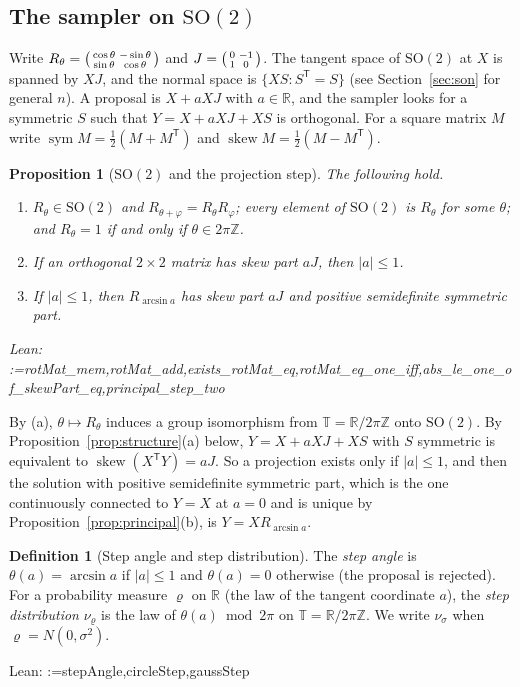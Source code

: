 \documentclass[11pt]{amsart}
\makeatletter
\newtheorem{proposition}[theorem]{Proposition}
\theoremstyle{definition}
\newtheorem{definition}[theorem]{Definition}
\theoremstyle{remark}
\newcommand{\@leanlist}[1]{\def\@leansep{}\@for\@leanname:=#1\do{\@leansep
  \texttt{\expandafter\detokenize\expandafter{\@leanname}}\def\@leansep{, }}}
\newcommand{\lean}[1]{\par\smallskip\noindent
  {\footnotesize\normalfont\raggedright\textsf{Lean:} \@leanlist{#1}\par}}
\newcommand{\R}{\mathbb{R}}
\newcommand{\Z}{\mathbb{Z}}
\newcommand{\T}{\mathbb{T}}
\newcommand{\SO}{\mathrm{SO}}
\newcommand{\sym}{\operatorname{sym}}
\newcommand{\skw}{\operatorname{skew}}
\newcommand{\transp}{^{\mathsf T}}
\makeatother
\begin{document}
\subsection{The sampler on \texorpdfstring{$\SO(2)$}{SO(2)}}
Write $R_\theta=\begin{psmallmatrix}\cos\theta&-\sin\theta\\\sin\theta&\cos\theta\end{psmallmatrix}$
and $J=\begin{psmallmatrix}0&-1\\1&0\end{psmallmatrix}$.  The tangent space of $\SO(2)$ at $X$
is spanned by $XJ$, and the normal space is $\{XS:S\transp=S\}$ (see Section~\ref{sec:son} for
general $n$).  A proposal is $X+aXJ$ with $a\in\R$, and the sampler looks for a symmetric $S$
such that $Y=X+aXJ+XS$ is orthogonal.  For a square matrix $M$ write
$\sym M=\tfrac12(M+M\transp)$ and $\skw M=\tfrac12(M-M\transp)$.

\begin{proposition}[$\SO(2)$ and the projection step]\label{prop:so2-model}
The following hold.
\begin{enumerate}
\item[(a)] $R_\theta\in\SO(2)$ and $R_{\theta+\varphi}=R_\theta R_\varphi$; every element of
$\SO(2)$ is $R_\theta$ for some $\theta$; and $R_\theta=1$ if and only if $\theta\in2\pi\Z$.
\item[(b)] If an orthogonal $2\times2$ matrix has skew part $aJ$, then $|a|\le1$.
\item[(c)] If $|a|\le1$, then $R_{\arcsin a}$ has skew part $aJ$ and positive semidefinite
symmetric part.
\end{enumerate}
\lean{rotMat_mem,rotMat_add,exists_rotMat_eq,rotMat_eq_one_iff,abs_le_one_of_skewPart_eq,principal_step_two}
\end{proposition}

By (a), $\theta\mapsto R_\theta$ induces a group isomorphism from $\T=\R/2\pi\Z$ onto $\SO(2)$.
By Proposition~\ref{prop:structure}(a) below, $Y=X+aXJ+XS$ with $S$ symmetric is equivalent to
$\skw(X\transp Y)=aJ$.  So a projection exists only if $|a|\le1$, and then the solution with
positive semidefinite symmetric part, which is the one continuously connected to $Y=X$ at $a=0$
and is unique by Proposition~\ref{prop:principal}(b), is $Y=XR_{\arcsin a}$.

\begin{definition}[Step angle and step distribution]\label{def:step}
The \emph{step angle} is $\theta(a)=\arcsin a$ if $|a|\le1$ and $\theta(a)=0$ otherwise (the
proposal is rejected).  For a probability measure $\varrho$ on $\R$ (the law of the tangent
coordinate $a$), the \emph{step distribution} $\nu_\varrho$ is the law of $\theta(a)\bmod2\pi$
on $\T=\R/2\pi\Z$.  We write $\nu_\sigma$ when $\varrho=N(0,\sigma^2)$.
\lean{stepAngle,circleStep,gaussStep}
\end{definition}
\end{document}
